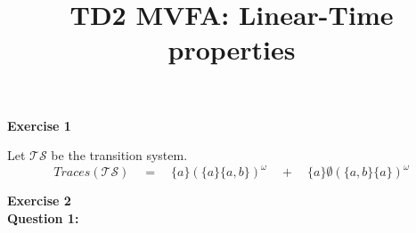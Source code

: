 \documentclass[11pt,a4paper]{article}
\title{TD2 MVFA: Linear-Time properties}
\date{}
\def\exercise#1{\Large\textbf{Exercise #1}\normalsize\\}
\def\question#1{\textbf{Question #1:}\quad}
\begin{document}
\maketitle

\exercise{1}
\def\seta{\{a\}}
\def\setab{\{a,b\}}


Let $\mathcal{TS}$ be the transition system.
$$\mathit{Traces}(\mathcal{TS})\quad=\quad\seta(\seta\setab)^\omega \quad+\quad \seta\emptyset(\setab\seta)^\omega$$

\exercise{2}
\question{1}
\end{document}
